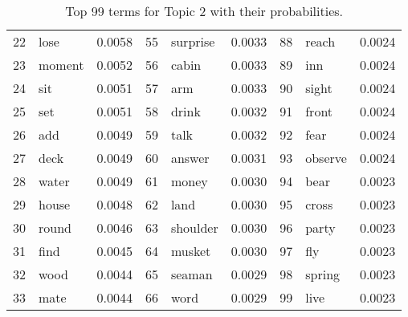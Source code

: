 \begin{table}[ht]
\begin{tabular}{rlrrlrrlr}
  22 & lose & 0.0058 & 55 & surprise & 0.0033 & 88 & reach & 0.0024 \\ 
  23 & moment & 0.0052 & 56 & cabin & 0.0033 & 89 & inn & 0.0024 \\ 
  24 & sit & 0.0051 & 57 & arm & 0.0033 & 90 & sight & 0.0024 \\ 
  25 & set & 0.0051 & 58 & drink & 0.0032 & 91 & front & 0.0024 \\ 
  26 & add & 0.0049 & 59 & talk & 0.0032 & 92 & fear & 0.0024 \\ 
  27 & deck & 0.0049 & 60 & answer & 0.0031 & 93 & observe & 0.0024 \\ 
  28 & water & 0.0049 & 61 & money & 0.0030 & 94 & bear & 0.0023 \\ 
  29 & house & 0.0048 & 62 & land & 0.0030 & 95 & cross & 0.0023 \\ 
  30 & round & 0.0046 & 63 & shoulder & 0.0030 & 96 & party & 0.0023 \\ 
  31 & find & 0.0045 & 64 & musket & 0.0030 & 97 & fly & 0.0023 \\ 
  32 & wood & 0.0044 & 65 & seaman & 0.0029 & 98 & spring & 0.0023 \\ 
  33 & mate & 0.0044 & 66 & word & 0.0029 & 99 & live & 0.0023 \\ 
   \hline
\end{tabular}
\caption{\small{ Top 99 terms for Topic 2 with their probabilities.}} 
\label{topic_2_terms}
\end{table}
